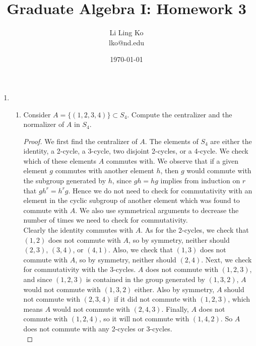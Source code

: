 \documentclass{article}
\begin{document}
\title{Graduate Algebra I: Homework 3}
\author{Li Ling Ko\\ lko@nd.edu}
\date{\today}
\maketitle

\begin{enumerate}
  \item
    \begin{enumerate}
      \item Consider $A=\{(1,2,3,4)\}\subset S_4$. Compute the centralizer
        and the normalizer of $A$ in $S_4$.
        \begin{proof}
          We first find the centralizer of $A$. The elements of $S_4$ are
          either the identity, a 2-cycle, a 3-cycle, two disjoint 2-cycles,
          or a 4-cycle. We check which of these elements $A$ commutes
          with. We observe that if a given element $g$ commutes with
          another element $h$, then $g$ would commute with the subgroup
          generated by $h$, since $gh=hg$ implies from induction on $r$
          that $gh^r=h^rg$. Hence we do not need to check for commutativity
          with an element in the cyclic subgroup of another element which
          was found to commute with $A$. We also use symmetrical arguments
          to decrease the number of times we need to check for
          commutativity. \\

          Clearly the identity commutes with $A$. As for the 2-cycles, we
          check that $(1,2)$ does not commute with $A$, so by symmetry,
          neither should $(2,3)$, $(3,4)$, or $(4,1)$. Also, we
          check that $(1,3)$ does not commute with $A$, so by symmetry,
          neither should $(2,4)$. Next, we check for commutativity with the
          3-cycles. $A$ does not commute with $(1,2,3)$, and since
          $(1,2,3)$ is contained in the group generated by $(1,3,2)$, $A$
          would not commute with $(1,3,2)$ either. Also by symmetry, $A$
          should not commute with $(2,3,4)$ if it did not commute with
          $(1,2,3)$, which means $A$ would not commute with $(2,4,3)$.
          Finally, $A$ does not commute with $(1,2,4)$, so it will not
          commute with $(1,4,2)$. So $A$ does not commute with any 2-cycles
          or 3-cycles. \\


\end{proof}
\end{enumerate}
\end{enumerate}
\end{document}
